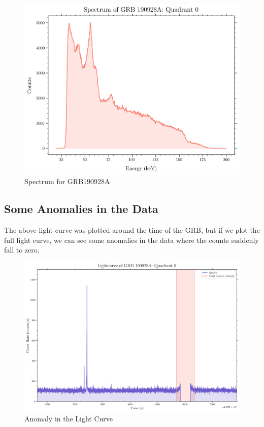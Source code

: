 \documentclass[11pt]{book} %
\begin{document}
\begin{figure}[H]
    \centering
    \includegraphics[scale=0.55]{Pictures/spectrum.png}
    \caption{Spectrum for GRB190928A}
\end{figure}

\subsection{Some Anomalies in the Data}

The above light curve was plotted around the time of the GRB, but if we plot the full light curve, we can see some anomalies in the data where the counts suddenly fall to zero.
\begin{figure}[H]
    \centering
    \includegraphics[scale=0.3]{Pictures/anomaly.png}
    \caption{Anomaly in the Light Curve}\label{fig:anomaly}
\end{figure}
\end{document}
